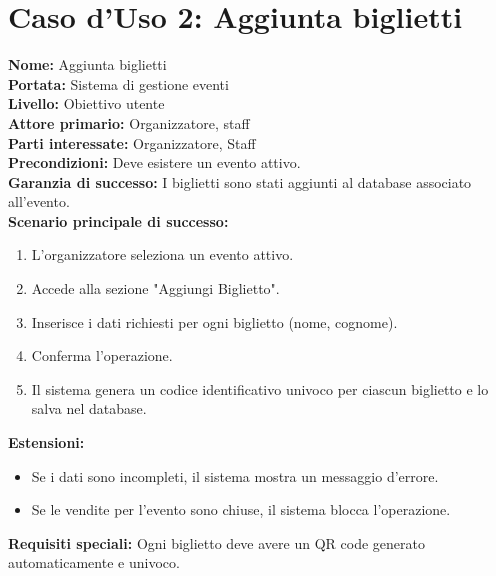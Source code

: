 \documentclass[a4paper,12pt]{article}
\begin{document}
\section*{\textcolor{sectioncolor}{Caso d'Uso 2: Aggiunta biglietti}}
\textcolor{textcolor}{
\textbf{Nome:} Aggiunta biglietti\\
\textbf{Portata:} Sistema di gestione eventi\\
\textbf{Livello:} Obiettivo utente\\
\textbf{Attore primario:} Organizzatore, staff\\
\textbf{Parti interessate:} Organizzatore, Staff\\
\textbf{Precondizioni:} Deve esistere un evento attivo.\\
\textbf{Garanzia di successo:} I biglietti sono stati aggiunti al database associato all'evento.\\
\textbf{Scenario principale di successo:}
\begin{enumerate}
    \item L'organizzatore seleziona un evento attivo.
    \item Accede alla sezione "Aggiungi Biglietto".
    \item Inserisce i dati richiesti per ogni biglietto (nome, cognome).
    \item Conferma l'operazione.
    \item Il sistema genera un codice identificativo univoco per ciascun biglietto e lo salva nel database.
\end{enumerate}
\textbf{Estensioni:}
\begin{itemize}
    \item Se i dati sono incompleti, il sistema mostra un messaggio d'errore.
    \item Se le vendite per l'evento sono chiuse, il sistema blocca l'operazione.
\end{itemize}
\textbf{Requisiti speciali:} Ogni biglietto deve avere un QR code generato automaticamente e univoco.
}
\end{document}

